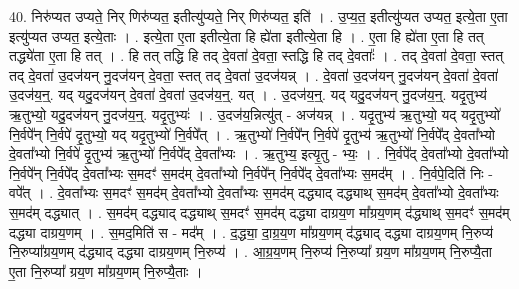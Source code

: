 \documentclass[17pt]{extarticle}
\begin{document}
40. निरु॑प्यत उप्यते॒ निर् णिरु॑प्यत॒ इतीत्यु॑प्यते॒ निर् णिरु॑प्यत॒ इति॑ । . उ॒प्य॒त॒ इतीत्यु॑प्यत उप्यत॒ इत्ये॒ता ए॒ता इत्यु॑प्यत उप्यत॒ इत्ये॒ताः । . इत्ये॒ता ए॒ता इतीत्ये॒ता हि ह्ये॑ता इतीत्ये॒ता हि । . ए॒ता हि ह्ये॑ता ए॒ता हि तत् तद्ध्ये॑ता ए॒ता हि तत् । . हि तत् तद्धि हि तद् दे॒वता॑ दे॒वता॒ स्तद्धि हि तद् दे॒वताः᳚ । . तद् दे॒वता॑ दे॒वता॒ स्तत् तद् दे॒वता॑ उ॒दज॑यन् नु॒दज॑यन् दे॒वता॒ स्तत् तद् दे॒वता॑ उ॒दज॑यन्न् । . दे॒वता॑ उ॒दज॑यन् नु॒दज॑यन् दे॒वता॑ दे॒वता॑ उ॒दज॑य॒न्॒. यद् यदु॒दज॑यन् दे॒वता॑ दे॒वता॑ उ॒दज॑य॒न्॒. यत् । . उ॒दज॑य॒न्॒. यद् यदु॒दज॑यन् नु॒दज॑य॒न्॒. यदृ॒तुभ्य॑ ऋ॒तुभ्यो॒ यदु॒दज॑यन् नु॒दज॑य॒न्॒. यदृ॒तुभ्यः॑ । . उ॒दज॑य॒न्नित्यु॑त् - अज॑यन्न् । . यदृ॒तुभ्य॑ ऋ॒तुभ्यो॒ यद् यदृ॒तुभ्यो॑ नि॒र्वपे᳚न् नि॒र्वपे॑ दृ॒तुभ्यो॒ यद् यदृ॒तुभ्यो॑ नि॒र्वपे᳚त् । . ऋ॒तुभ्यो॑ नि॒र्वपे᳚न् नि॒र्वपे॑ दृ॒तुभ्य॑ ऋ॒तुभ्यो॑ नि॒र्वपे᳚द् दे॒वता᳚भ्यो दे॒वता᳚भ्यो नि॒र्वपे॑ दृ॒तुभ्य॑ ऋ॒तुभ्यो॑ नि॒र्वपे᳚द् दे॒वता᳚भ्यः । . ऋ॒तुभ्य॒ इत्यृ॒तु - भ्यः॒ । . नि॒र्वपे᳚द् दे॒वता᳚भ्यो दे॒वता᳚भ्यो नि॒र्वपे᳚न् नि॒र्वपे᳚द् दे॒वता᳚भ्यः स॒मदꣳ॑ स॒मद॑म् दे॒वता᳚भ्यो नि॒र्वपे᳚न् नि॒र्वपे᳚द् दे॒वता᳚भ्यः स॒मद᳚म् । . नि॒र्वपे॒दिति॑ निः - वपे᳚त् । . दे॒वता᳚भ्यः स॒मदꣳ॑ स॒मद॑म् दे॒वता᳚भ्यो दे॒वता᳚भ्यः स॒मद॑म् दद्ध्याद् दद्ध्याथ् स॒मद॑म् दे॒वता᳚भ्यो दे॒वता᳚भ्यः स॒मद॑म् दद्ध्यात् । . स॒मद॑म् दद्ध्याद् दद्ध्याथ् स॒मदꣳ॑ स॒मद॑म् दद्ध्या दाग्रय॒ण मा᳚ग्रय॒णम् द॑द्ध्याथ् स॒मदꣳ॑ स॒मद॑म् दद्ध्या दाग्रय॒णम् । . स॒मद॒मिति॑ स - मद᳚म् । . द॒द्ध्या॒ दा॒ग्र॒य॒ण मा᳚ग्रय॒णम् द॑द्ध्याद् दद्ध्या दाग्रय॒णम् नि॒रुप्य॑ नि॒रुप्या᳚ग्रय॒णम् द॑द्ध्याद् दद्ध्या दाग्रय॒णम् नि॒रुप्य॑ । . आ॒ग्र॒य॒णम् नि॒रुप्य॑ नि॒रुप्या᳚ ग्रय॒ण मा᳚ग्रय॒णम् नि॒रुप्यै॒ता ए॒ता नि॒रुप्या᳚ ग्रय॒ण मा᳚ग्रय॒णम् नि॒रुप्यै॒ताः । \newline
\end{document}
